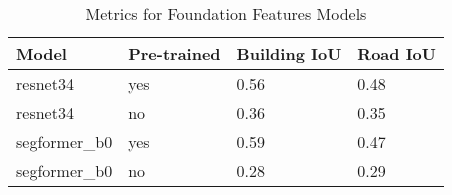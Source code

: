 \begin{table}
    \begin{tabular}{llll}
        Model & Pre-trained & Building IoU & Road IoU \\
        \hline
        resnet34 & yes & 0.56 & 0.48 \\
        resnet34 & no & 0.36 & 0.35 \\
        segformer\_b0 & yes & 0.59 & 0.47 \\
        segformer\_b0 & no & 0.28 & 0.29 \\
    \end{tabular}
    \caption{Metrics for Foundation Features Models}
\end{table}
